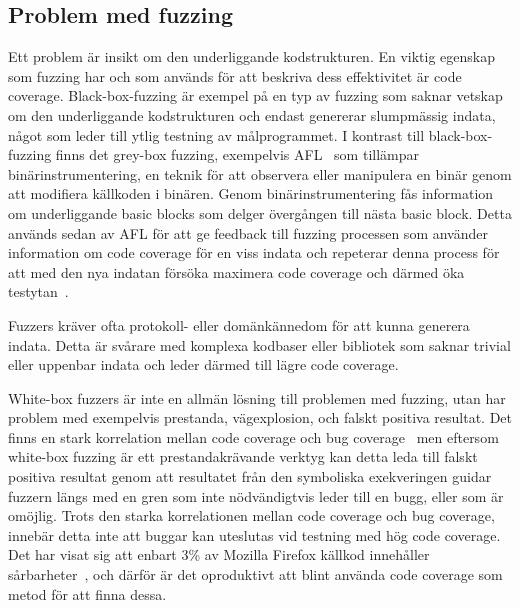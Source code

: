 \subsection{Problem med fuzzing} Ett problem är insikt om den underliggande
kodstrukturen. En viktig egenskap som fuzzing har och som används för att beskriva dess
effektivitet är code coverage. Black-box-fuzzing är exempel på en typ av fuzzing som
saknar vetskap om den underliggande kodstrukturen och endast genererar
slumpmässig indata, något som leder till ytlig testning av målprogrammet. I
kontrast till black-box-fuzzing finns det grey-box fuzzing, exempelvis
AFL~\cite{aflplusplus} som tillämpar binärinstrumentering, en
teknik för att observera eller manipulera en binär genom att modifiera källkoden
i binären. Genom binärinstrumentering fås information om underliggande basic blocks
som delger övergången till nästa basic block. Detta används sedan av AFL för att ge
feedback till fuzzing processen som använder information om code coverage
för en viss indata och repeterar denna process för att med den nya indatan försöka
maximera code coverage och därmed öka testytan~\cite{challenges_fuzzing}.

Fuzzers kräver ofta protokoll- eller domänkännedom för att kunna generera
indata. Detta är svårare med komplexa kodbaser eller bibliotek som saknar
trivial eller uppenbar indata och leder därmed till lägre code coverage.

White-box fuzzers är inte en allmän lösning till problemen med fuzzing, utan
har problem med exempelvis prestanda, vägexplosion, och falskt positiva
resultat. Det finns en stark korrelation mellan code coverage och bug
coverage~\cite{directed_greybox_fuzzing} men eftersom white-box fuzzing är ett
prestandakrävande verktyg kan detta leda till falskt positiva resultat genom att
resultatet från den symboliska exekveringen guidar fuzzern längs med en gren som
inte nödvändigtvis leder till en bugg, eller som är omöjlig. Trots den starka korrelationen
mellan code coverage och bug coverage, innebär detta inte att buggar kan uteslutas vid
testning med hög code coverage. Det har visat sig att enbart 3\% av Mozilla Firefox
källkod innehåller sårbarheter~\cite{fault_prediction_vuln_pred}, och därför är det oproduktivt att
blint använda code coverage som metod för att finna dessa.

